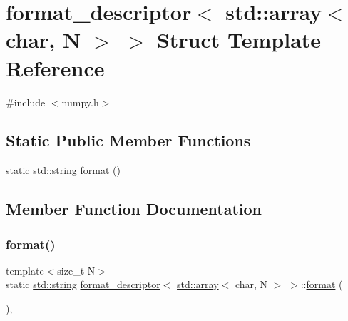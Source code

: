 \hypertarget{structformat__descriptor_3_01std_1_1array_3_01char_00_01_n_01_4_01_4}{}\section{format\+\_\+descriptor$<$ std\+::array$<$ char, N $>$ $>$ Struct Template Reference}
\label{structformat__descriptor_3_01std_1_1array_3_01char_00_01_n_01_4_01_4}


{\ttfamily \#include $<$numpy.\+h$>$}

\subsection*{Static Public Member Functions}
\begin{DoxyCompactItemize}
\item 
static \mbox{\hyperlink{_s_d_l__opengl__glext_8h_ab4ccfaa8ab0e1afaae94dc96ef52dde1}{std\+::string}} \mbox{\hyperlink{structformat__descriptor_3_01std_1_1array_3_01char_00_01_n_01_4_01_4_a3230445e2c426bac1a67e6cdcbe7d67e}{format}} ()
\end{DoxyCompactItemize}


\subsection{Member Function Documentation}
\mbox{\label{structformat__descriptor_3_01std_1_1array_3_01char_00_01_n_01_4_01_4_a3230445e2c426bac1a67e6cdcbe7d67e}} 
\subsubsection{\texorpdfstring{format()}{format()}}
{\footnotesize\ttfamily template$<$size\+\_\+t N$>$ \\
static \mbox{\hyperlink{_s_d_l__opengl__glext_8h_ab4ccfaa8ab0e1afaae94dc96ef52dde1}{std\+::string}} \mbox{\hyperlink{structformat__descriptor}{format\+\_\+descriptor}}$<$ \mbox{\hyperlink{_s_d_l__opengl__glext_8h_a52f38e7d822a46377fde7a02708eedb1}{std\+::array}}$<$ char, N $>$ $>$\+::\mbox{\hyperlink{_s_d_l__audio_8h_a71a65ffd977afe9c3fef116a5bc9ee27}{format}} (\begin{DoxyParamCaption}{ }\end{DoxyParamCaption})\hspace{0.3cm}{\ttfamily [inline]}, {\ttfamily [static]}}



